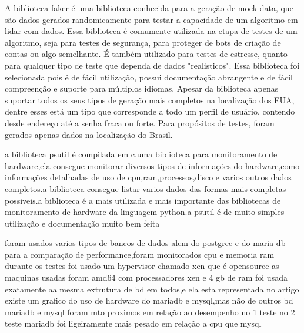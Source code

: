 \documentclass[
	12pt,				%
	openright,			%
	oneside,			%
	a4paper,			%
	english,			%
	french,				%
	spanish,			%
	brazil,				%
	]{abntex2}
\begin{document}
A biblioteca faker é uma biblioteca conhecida para a geração de mock data, que são dados gerados randomicamente para testar a capacidade de um algoritmo em lidar com dados. Essa biblioteca é comumente utilizada na etapa de testes de um algoritmo, seja para testes de segurança, para proteger de bots de criação de contas ou algo semelhante. É também utilizado para testes de estresse, quanto para qualquer tipo de teste que dependa de dados "realisticos".\newline
Essa biblioteca foi selecionada pois é de fácil utilização, possui documentação abrangente e de fácil compreenção e suporte para múltiplos idiomas. Apesar da biblioteca apenas suportar todos os seus tipos de geração mais completos na localização dos EUA, dentre esses está um tipo que corresponde a todo um perfil de usuário, contendo desde endereço até a senha fraca ou forte. Para propósitos de testes, foram gerados apenas dados na localização do Brasil.\newline

a biblioteca psutil é compilada em c,uma biblioteca para monitoramento de hardware,ela consegue monitorar diversos tipos de informações do hardware,como informações detalhadas de uso de cpu,ram,processos,disco e varios outros dados completos.a biblioteca consegue listar varios dados das formas mais completas possiveis.a biblioteca é a mais utilizada e mais importante das bibliotecas de monitoramento de hardware da linguagem python.a psutil é de muito simples utilização e documentação muito bem feita


foram usados varios tipos de bancos de dados alem do postgree e do maria db para a comparação de performance,foram monitorados cpu e memoria ram
durante os testes foi usado um hypervisor chamado xen que é opensource
as maquinas usadas foram amd64 com processadores xen e 4 gb de ram
foi usada exatamente aa mesma extrutura de bd em todos,e ela esta representada no artigo
existe um grafico do uso de hardware do mariadb e mysql,mas não de outros bd
mariadb e mysql foram mto proximos em relação ao desempenho no 1 teste
no 2 teste mariadb foi ligeiramente mais pesado em relação a cpu que mysql
\end{document}
